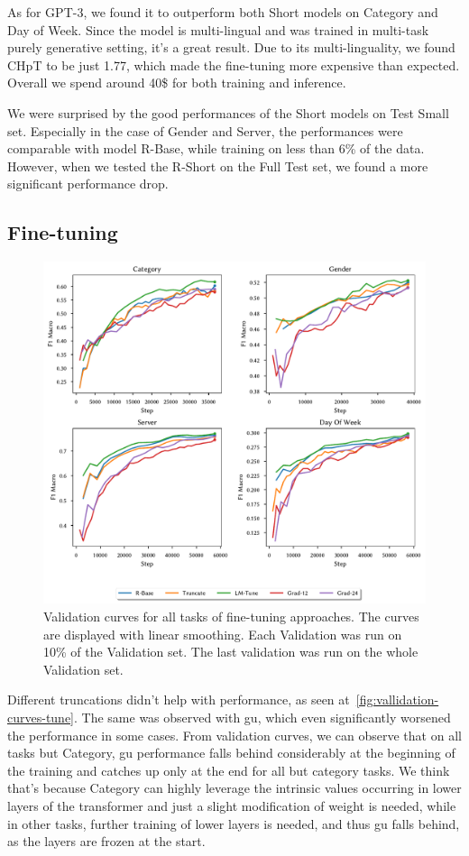 As for GPT-3, we found it to outperform both Short models on Category and Day of Week.
Since the model is multi-lingual and was trained in multi-task purely generative setting,
it's a great result. Due to its multi-linguality, we found CHpT to be just
1.77, which made the fine-tuning more expensive than expected.
Overall we spend around 40\$ for both training and inference.

We were surprised by the good performances of the Short models on Test Small set.
Especially in the case of Gender and Server, the performances were comparable with model R-Base, while
training on less than 6\% of the data. However, when we tested the R-Short on the Full Test set,
we found a more significant performance drop.

\subsection{Fine-tuning}
\begin{figure}[ht]
    \centering
    \includegraphics[width=1.0\textwidth]{graph_create/outputs/tune.pdf}
    \caption{Validation curves for all tasks of fine-tuning approaches. The curves are displayed
        with linear smoothing. Each Validation was run on 10\% of the Validation set. The last validation
        was run on the whole Validation set.}
    \label{fig:vallidation-curves-tune}
\end{figure}
Different truncations didn't help with performance, as seen at~\autoref{fig:vallidation-curves-tune}.
The same was observed with \ac{gu}, which even significantly worsened the performance
in some cases. From validation curves, we can observe that on all tasks but Category,
\ac{gu} performance falls behind considerably at the beginning of the training and
catches up only at the end for all but category tasks.
We think that's because Category can highly leverage the intrinsic values
occurring in lower layers of the transformer and just a slight modification of weight is needed,
while in other tasks, further training of lower layers is needed, and thus
\ac{gu} falls behind, as the layers are frozen at the start.


